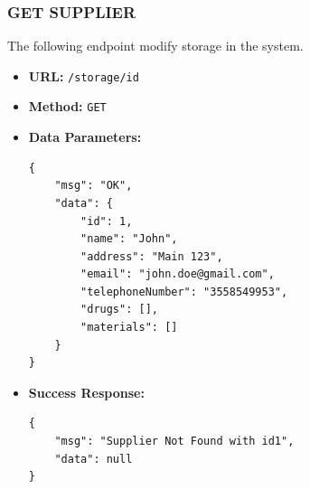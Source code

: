 \subsubsection*{GET SUPPLIER}
The following endpoint modify storage in the system.
\begin{itemize}
    \item \textbf{URL:}
    \newline \hspace*{1cm} \texttt{/storage/id}  
    \item \textbf{Method:}
    \newline \hspace*{1cm}\texttt{GET}
    \item \textbf{Data Parameters:}
\begin{lstlisting}[breaklines]
{
    "msg": "OK",
    "data": {
        "id": 1,
        "name": "John",
        "address": "Main 123",
        "email": "john.doe@gmail.com",
        "telephoneNumber": "3558549953",
        "drugs": [],
        "materials": []
    }
}

\end{lstlisting}
    \item \textbf{Success Response:}
\begin{lstlisting}[breaklines]
{
    "msg": "Supplier Not Found with id1",
    "data": null
}
\end{lstlisting}
  
\end{itemize}

